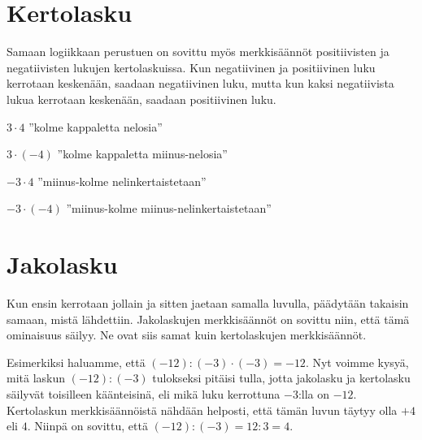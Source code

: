 

\section{Kertolasku}

    Samaan logiikkaan perustuen on sovittu myös merkkisäännöt positiivisten ja negatiivisten lukujen kertolaskuissa. Kun negatiivinen ja positiivinen luku kerrotaan keskenään, saadaan negatiivinen luku, mutta kun kaksi negatiivista lukua kerrotaan keskenään, saadaan positiivinen luku.

    $3 \cdot 4$ ''kolme kappaletta nelosia''
    
    
    $3 \cdot (-4)$ ''kolme kappaletta miinus-nelosia''
    
    
    $-3 \cdot 4$ ''miinus-kolme nelinkertaistetaan''
    
    
    $-3 \cdot (-4)$ ''miinus-kolme miinus-nelinkertaistetaan''
    

\section{Jakolasku}

        Kun ensin kerrotaan jollain ja sitten jaetaan samalla luvulla, päädytään takaisin samaan, mistä lähdettiin.  Jakolaskujen merkkisäännöt on sovittu niin, että tämä ominaisuus säilyy. Ne ovat siis samat kuin kertolaskujen merkkisäännöt.
    
    Esimerkiksi haluamme, että $(-12):(-3)\cdot (-3)=-12$. Nyt voimme kysyä, mitä laskun $(-12):(-3)$ tulokseksi pitäisi tulla, jotta jakolasku ja kertolasku säilyvät toisilleen käänteisinä, eli mikä luku kerrottuna $-3$:lla on $-12$. Kertolaskun merkkisäännöistä nähdään helposti, että tämän luvun täytyy olla $+4$ eli $4$. Niinpä on sovittu, että $(-12):(-3)=12:3=4$.


